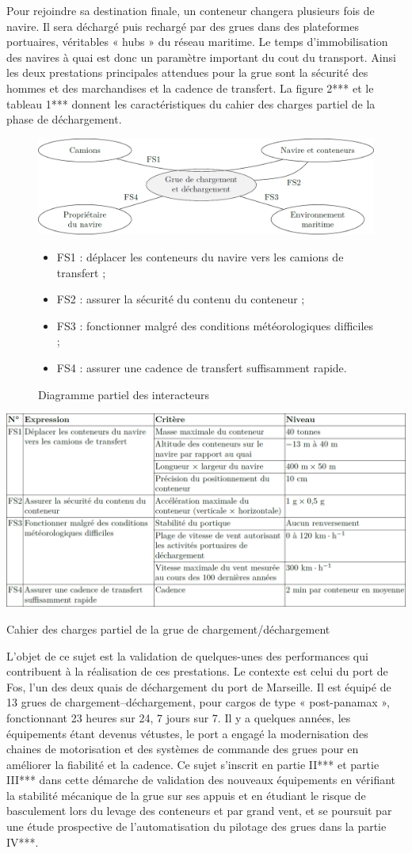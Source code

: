 \documentclass[10pt,fleqn]{article} %
\begin{document}
Pour rejoindre sa destination finale, un conteneur changera plusieurs fois de navire. Il sera déchargé puis rechargé
par des grues dans des plateformes portuaires, véritables « hubs » du réseau maritime.
Le temps d’immobilisation des navires à quai est donc un paramètre important du cout du transport. Ainsi
les deux prestations principales attendues pour la grue sont la sécurité des hommes et des marchandises et la
cadence de transfert. La figure 2*** et le tableau 1*** donnent les caractéristiques du cahier des charges partiel de la
phase de déchargement.


\begin{figure}[H]
\centering
\includegraphics[width=.8\linewidth]{images/fig_02}
\begin{itemize}
\item FS1 : déplacer les conteneurs du navire vers les camions de transfert ;
\item FS2 : assurer la sécurité du contenu du conteneur ;
\item FS3 : fonctionner malgré des conditions météorologiques difficiles ;
\item FS4 : assurer une cadence de transfert suffisamment rapide.
\end{itemize}
\caption{Diagramme partiel des interacteurs\label{fig_02}}
\end{figure}

\begin{table}[H]
\centering
\includegraphics[width=.48\linewidth]{images/tab_01}
\caption{Cahier des charges partiel de la grue de chargement/déchargement \label{tab_01}}
\end{table}


L’objet de ce sujet est la validation de quelques-unes des performances qui contribuent à la réalisation de ces
prestations.
Le contexte est celui du port de Fos, l’un des deux quais de déchargement du port de Marseille. Il est équipé de
13 grues de chargement–déchargement, pour cargos de type « post-panamax », fonctionnant 23 heures sur 24,
7 jours sur 7.
Il y a quelques années, les équipements étant devenus vétustes, le port a engagé la modernisation des chaines
de motorisation et des systèmes de commande des grues pour en améliorer la fiabilité et la cadence.
Ce sujet s’inscrit en partie II*** et partie III*** dans cette démarche de validation des nouveaux équipements en
vérifiant la stabilité mécanique de la grue sur ses appuis et en étudiant le risque de basculement lors du levage
des conteneurs et par grand vent, et se poursuit par une étude prospective de l’automatisation du pilotage des
grues dans la partie IV***.
\end{document}
